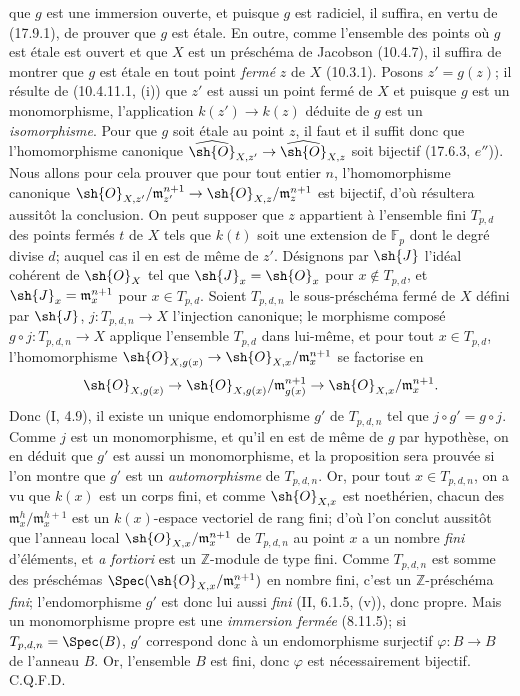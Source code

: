
que $g$ est une immersion ouverte, et puisque $g$ est radiciel, il suffira, en vertu de (17.9.1), de prouver que $g$ est étale. En outre, comme l'ensemble des points où $g$ est étale est ouvert et que $X$ est un préschéma de Jacobson (10.4.7), il suffira de montrer que $g$ est étale en tout point \emph{fermé} $z$ de $X$ (10.3.1). Posons $z'=g(z)$; il résulte de (10.4.11.1, (i)) que $z'$ est aussi un point fermé de $X$ et puisque $g$ est un monomorphisme, l'application $k(z')\to k(z)$ déduite de $g$ est un \emph{isomorphisme}. Pour que $g$ soit étale au point $z$, il faut et il suffit donc que l'homomorphisme canonique $\widehat{\sh{O}}_{X,z'}\to\widehat{\sh{O}}_{X,z}$ soit bijectif (17.6.3, $e''$)). Nous allons pour cela prouver que pour tout entier $n$, l'homomorphisme canonique $\sh{O}_{X,z'}/\mathfrak m_{z'}^{n+1}\to\sh{O}_{X,z}/\mathfrak m_z^{n+1}$ est bijectif, d'où résultera aussitôt la conclusion. On peut supposer que $z$ appartient à l'ensemble fini $T_{p,d}$ des points fermés $t$ de $X$ tels que $k(t)$ soit une extension de $\mathbb{F}_p$ dont le degré divise $d$; auquel cas il en est de même de $z'$. Désignons par $\sh{J}$ l'idéal cohérent de $\sh{O}_X$ tel que $\sh{J}_x=\sh{O}_x$ pour $x\notin T_{p,d}$, et $\sh{J}_x=\mathfrak m_x^{n+1}$ pour $x\in T_{p,d}$. Soient $T_{p,d,n}$ le sous-préschéma fermé de $X$ défini par $\sh{J}$, $j:T_{p,d,n}\to X$ l'injection canonique; le morphisme composé $g\circ j:T_{p,d,n}\to X$ applique l'ensemble $T_{p,d}$ dans lui-même, et pour tout $x\in T_{p,d}$, l'homomorphisme $\sh{O}_{X,g(x)}\to\sh{O}_{X,x}/\mathfrak m_x^{n+1}$ se factorise en
\[
\sh{O}_{X,g(x)}\to\sh{O}_{X,g(x)}/\mathfrak m_{g(x)}^{n+1}\to\sh{O}_{X,x}/\mathfrak m_x^{n+1}.
\]
Donc (I, 4.9), il existe un unique endomorphisme $g'$ de $T_{p,d,n}$ tel que $j\circ g'=g\circ j$. Comme $j$ est un monomorphisme, et qu'il en est de même de $g$ par hypothèse, on en déduit que $g'$ est aussi un monomorphisme, et la proposition sera prouvée si l'on montre que $g'$ est un \emph{automorphisme} de $T_{p,d,n}$. Or, pour tout $x\in T_{p,d,n}$, on a vu que $k(x)$ est un corps fini, et comme $\sh{O}_{X,x}$ est noethérien, chacun des $\mathfrak m_x^h/\mathfrak m_x^{h+1}$ est un $k(x)$-espace vectoriel de rang fini; d'où l'on conclut aussitôt que l'anneau local $\sh{O}_{X,x}/\mathfrak m_x^{n+1}$ de $T_{p,d,n}$ au point $x$ a un nombre \emph{fini} d'éléments, et \emph{a fortiori} est un $\mathbb{Z}$-module de type fini. Comme $T_{p,d,n}$ est somme des préschémas $\Spec(\sh{O}_{X,x}/\mathfrak m_x^{n+1})$ en nombre fini, c'est un $\mathbb{Z}$-préschéma \emph{fini}; l'endomorphisme $g'$ est donc lui aussi \emph{fini} (II, 6.1.5, (v)), donc propre. Mais un monomorphisme propre est une \emph{immersion fermée} (8.11.5); si $T_{p,d,n}=\Spec(B)$, $g'$ correspond donc à un endomorphisme surjectif $\varphi:B\to B$ de l'anneau $B$. Or, l'ensemble $B$ est fini, donc $\varphi$ est nécessairement bijectif. C.Q.F.D.

